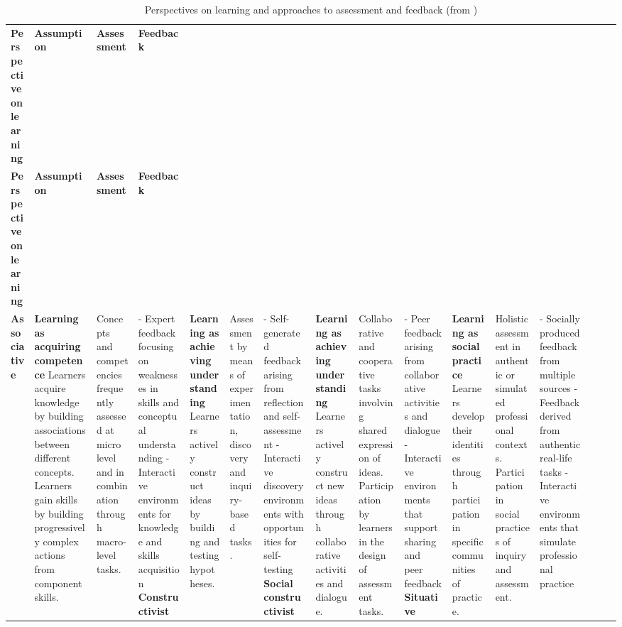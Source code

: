 \begin{longtable}{|L{0.188}|L{0.248}|L{0.204}|L{0.25}|}
	\caption[Perspectives on learning]{\label{Table: Perspectives on Learning} Perspectives on learning and approaches to assessment and feedback (from \citep{digiassess})} \\
	\hline \textbf{Perspective on learning} & \textbf{Assumption} & \textbf{Assessment} & \textbf{Feedback} \\ \hhline{|=|=|=|=|}
	\endfirsthead
	\hline \textbf{Perspective on learning} & \textbf{Assumption} & \textbf{Assessment} & \textbf{Feedback} \\ \hhline{|=|=|=|=|} \endhead
	 \endfoot
	\endlastfoot
	\textbf{Associative} & \textbf{Learning as acquiring competence} \newline Learners acquire knowledge by building associations between different concepts. \newline Learners gain skills by building progressively complex actions from component skills. & Concepts and competencies frequently assessed at micro level and in combination through macro-level tasks. & - Expert feedback focusing on weaknesses in skills and conceptual understanding \newline - Interactive environments for knowledge and skills acquisition \eoline
	\textbf{Constructivist} & \textbf{Learning as achieving understanding} \newline Learners actively construct ideas by building and testing hypotheses. & Assessment by means of experimentation, discovery and inquiry-based tasks. & - Self-generated feedback arising from reflection and self-assessment \newline - Interactive discovery environments with opportunities for self-testing \eoline
	\textbf{Social constructivist} & \textbf{Learning as achieving understanding} \newline Learners actively construct new ideas through collaborative activities and dialogue. & Collaborative and cooperative tasks involving shared expression of ideas. \newline Participation by learners in the design of assessment tasks. & - Peer feedback arising from collaborative activities and dialogue \newline - Interactive environments that support sharing and peer feedback \eoline
	\textbf{Situative} & \textbf{Learning as social practice} \newline Learners develop their identities through participation in specific communities of practice. & Holistic assessment in authentic or simulated professional contexts. \newline Participation in social practices of inquiry and assessment. & - Socially produced feedback from multiple sources \newline - Feedback derived from authentic real-life tasks \newline - Interactive environments that simulate professional practice \eoline
\end{longtable}

